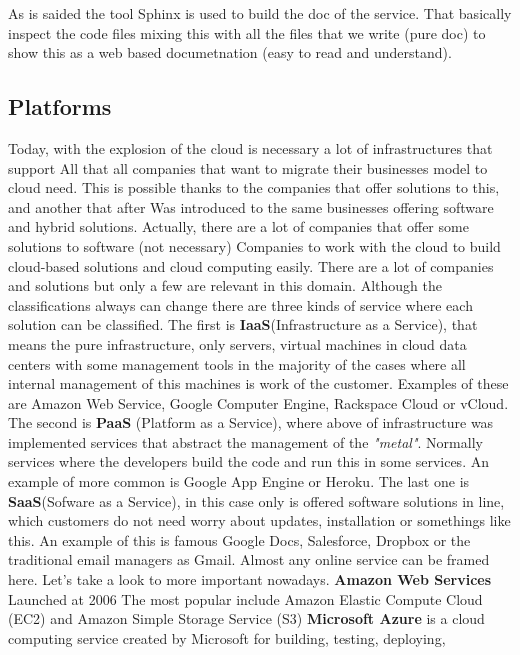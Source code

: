 As is saided the tool Sphinx is used to build the doc of the service.
That basically inspect the code files mixing this with all the files
that we write (pure doc) to show this as a web based documetnation
(easy to read and understand).


\subsection{Platforms}

Today, with the explosion of the cloud is necessary a lot of infrastructures that support
All that all companies that want to migrate their businesses model to cloud need.
This is possible thanks to the companies that offer solutions to this, and another that after
Was introduced to the same businesses offering software and hybrid solutions.
Actually, there are a lot of companies that offer some solutions to software (not necessary)
Companies to work with the cloud to build cloud-based solutions and cloud computing easily.
\intro
There are a lot of companies and solutions but only a few are relevant in this domain.
Although the classifications always can change there are three kinds of service
where each solution can be classified.
\intro
The first is \textbf{IaaS}(Infrastructure as a Service), that means the pure
infrastructure, only servers, virtual machines in cloud data centers with some
 management tools in the majority of the cases where all internal management of
 this machines is work of the customer. Examples of these are
Amazon Web Service, Google Computer Engine, Rackspace Cloud or vCloud.
The second is
\intro
\textbf{PaaS} (Platform as a Service), where above of infrastructure was implemented
services that abstract the management of the \textit{"metal"}. Normally services
where the developers build the code and run this in some services. An example of more
common is Google App Engine or Heroku.
\intro
The last one is \textbf{SaaS}(Sofware as a Service), in this case only is offered
software solutions in line, which customers do not need worry about updates,
installation or somethings like this. An example of this is famous Google Docs,
Salesforce, Dropbox or the traditional email managers as Gmail. Almost any online
service can be framed here.
Let's take a look to more important nowadays.
\intro
\textbf{Amazon Web Services}
\intro
Launched at 2006 The most popular include Amazon Elastic
Compute Cloud (EC2) and Amazon Simple Storage Service (S3)
\intro
\textbf{Microsoft Azure}
\intro
is a cloud computing service created by Microsoft for building, testing, deploying,
